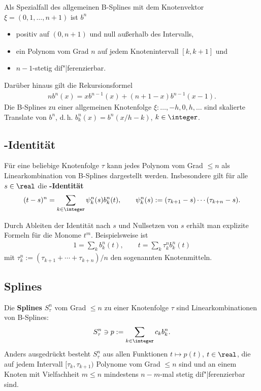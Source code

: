 Als Spezialfall des allgemeinen B-Splines mit dem Knotenvektor
$\xi = (0, 1, \dotsc, n + 1)$ ist $b^n$
\begin{itemize}
    \item
    positiv auf $(0, n + 1)$ und null außerhalb des Intervalls,

    \item
    ein Polynom vom Grad $n$ auf jedem Knotenintervall $[k, k + 1]$ und

    \item
    $n - 1$-stetig dif"|ferenzierbar.
\end{itemize}
Darüber hinaus gilt die Rekursionsformel
\begin{align*}
    n b^n(x) = x b^{n-1}(x) + (n + 1 - x) b^{n-1}(x - 1).
\end{align*}
Die B-Splines zu einer allgemeinen Knotenfolge
$\xi\colon \dotsc, -h, 0, h, \dotsc$
sind skalierte Translate von $b^n$, d.\,h. $b_k^n(x) = b^n(x/h - k)$,
$k \in \integer$.

\subsection{%
    -Identität%
}

Für eine beliebige Knotenfolge $\tau$ kann jedes Polynom vom Grad $\le n$
als Linearkombination von B-Splines dargestellt werden.
Insbesondere gilt für alle $s \in \real$ die \textbf{-Identität}
\begin{align*}
    (t - s)^n = \sum_{k \in \integer} \psi_k^n(s) b_k^n(t), \qquad
    \psi_k^n(s) := (\tau_{k+1} - s) \dotsm (\tau_{k+n} - s).
\end{align*}

Durch Ableiten der Identität nach $s$ und Nullsetzen von $s$ erhält man
explizite Formeln für die Monome $t^m$.
Beispielsweise ist
\begin{align*}
    1 = \sum_k b_k^n(t), \qquad
    t = \sum_k \tau_k^n b_k^n(t)
\end{align*}
mit $\tau_k^n := (\tau_{k+1} + \dotsb + \tau_{k+n}) / n$ den sogenannten
Knotenmitteln.

\subsection{%
    Splines%
}

Die \textbf{Splines} $S_\tau^n$ vom Grad $\le n$ zu einer Knotenfolge $\tau$
sind Linearkombinationen von B-Splines:
\begin{align*}
    S_\tau^n \ni p := \sum_{k \in \integer} c_k b_k^n.
\end{align*}
Anders ausgedrückt besteht $S_\tau^n$ aus allen Funktionen $t \mapsto p(t)$,
$t \in \real$, die auf jedem Intervall $[\tau_k, \tau_{k+1})$ Polynome
vom Grad $\le n$ sind und an einem Knoten mit Vielfachheit $m \le n$
mindestens $n - m$-mal stetig dif"|ferenzierbar sind.

